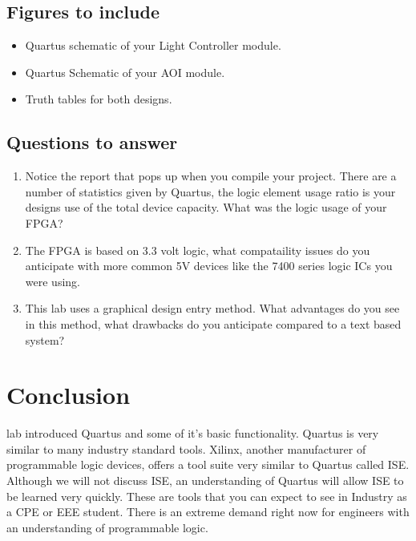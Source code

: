     \subsection{Figures to include}
    \begin{itemize}
      \item Quartus schematic of your Light Controller module.
      \item Quartus Schematic of your AOI module.
      \item Truth tables for both designs.
    \end{itemize}

    \subsection{Questions to answer}
    \begin{enumerate}
      \item Notice the report that pops up when you compile your project. There are a number of statistics given by Quartus, the logic element usage ratio is your designs use of the total device capacity. What was the logic usage of your FPGA?
      \item The FPGA is based on 3.3 volt logic, what compataility issues do you anticipate with more common 5V devices like the 7400 series logic ICs you were using.
      \item This lab uses a graphical design entry method. What advantages do you see in this method, what drawbacks do you anticipate compared to a text based system?
    \end{enumerate}

  \section{Conclusion}
     lab introduced Quartus and some of it's basic functionality. Quartus is very similar to many industry standard tools. Xilinx, another manufacturer of programmable logic devices, offers a tool suite very similar to Quartus called ISE. Although we will not discuss ISE, an understanding of Quartus will allow ISE to be learned very quickly. These are tools that you can expect to see in Industry as a CPE or EEE student. There is an extreme demand right now for engineers with an understanding of programmable logic.

  

